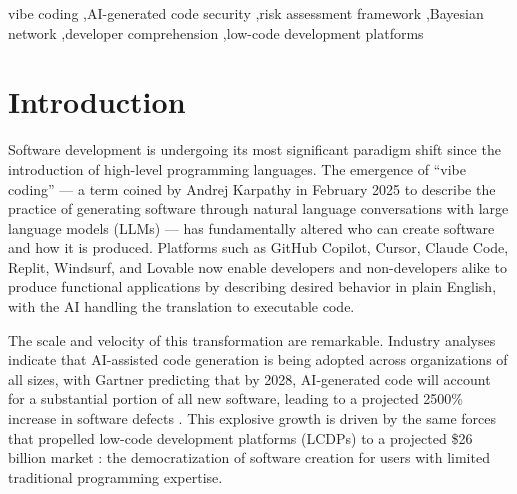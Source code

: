 \documentclass[preprint,review,12pt]{elsarticle}
\begin{document}
\begin{frontmatter}

\begin{keyword}
vibe coding \sep AI-generated code security \sep risk assessment framework \sep Bayesian network \sep developer comprehension \sep low-code development platforms
\end{keyword}

\end{frontmatter}


\section{Introduction}
\label{sec:introduction}

Software development is undergoing its most significant paradigm shift since the introduction of high-level programming languages. The emergence of ``vibe coding'' --- a term coined by Andrej Karpathy in February 2025 \cite{karpathy2025vibe} to describe the practice of generating software through natural language conversations with large language models (LLMs) --- has fundamentally altered who can create software and how it is produced. Platforms such as GitHub Copilot, Cursor, Claude Code, Replit, Windsurf, and Lovable now enable developers and non-developers alike to produce functional applications by describing desired behavior in plain English, with the AI handling the translation to executable code.

The scale and velocity of this transformation are remarkable. Industry analyses indicate that AI-assisted code generation is being adopted across organizations of all sizes, with Gartner predicting that by 2028, AI-generated code will account for a substantial portion of all new software, leading to a projected 2500\% increase in software defects \cite{gartner2026defects}. This explosive growth is driven by the same forces that propelled low-code development platforms (LCDPs) to a projected \$26 billion market \cite{gartner2024lowcode}: the democratization of software creation for users with limited traditional programming expertise.
\end{document}

